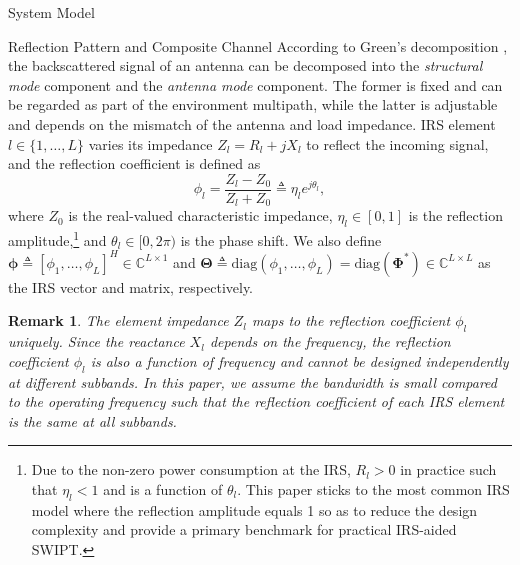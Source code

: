 \documentclass[journal,12pt,onecolumn,draftclsnofoot]{IEEEtran}
\newtheorem{remark}{Remark}
\begin{document}
\begin{section}{System Model}
		\begin{subsection}{Reflection Pattern and Composite Channel}
			According to Green's decomposition \cite{Hansen1989}, the backscattered signal of an antenna can be decomposed into the \emph{structural mode} component and the \emph{antenna mode} component. The former is fixed and can be regarded as part of the environment multipath, while the latter is adjustable and depends on the mismatch of the antenna and load impedance. IRS element $l \in \{1, \dots, L\}$ varies its impedance $Z_l = R_l + j X_l$ to reflect the incoming signal, and the reflection coefficient is defined as
			\begin{equation}
				\phi_l = \frac{Z_l - Z_0}{Z_l + Z_0} \triangleq \eta_l e^{j\theta_l},
			\end{equation}
			where $Z_0$ is the real-valued characteristic impedance, $\eta_l \in [0, 1]$ is the reflection amplitude,\footnote{Due to the non-zero power consumption at the IRS, $R_l > 0$ in practice such that $\eta_l < 1$ and is a function of $\theta_l$. This paper sticks to the most common IRS model where the reflection amplitude equals \num{1} so as to reduce the design complexity and provide a primary benchmark for practical IRS-aided SWIPT.} and $\theta_l \in [0,2\pi)$ is the phase shift. We also define $\boldsymbol{\phi} \triangleq [\phi_1, \dots, \phi_L]^H \in \mathbb{C}^{L \times 1}$ and $\boldsymbol{\Theta} \triangleq \mathrm{diag}(\phi_1, \dots, \phi_L)=\mathrm{diag}(\boldsymbol{\Phi}^*) \in \mathbb{C}^{L \times L}$ as the IRS vector and matrix, respectively.

			\begin{remark}\label{re:reflection_coefficient}
				The element impedance $Z_l$ maps to the reflection coefficient $\phi_l$ uniquely. Since the reactance $X_l$ depends on the frequency, the reflection coefficient $\phi_l$ is also a function of frequency and cannot be designed independently at different subbands. In this paper, we assume the bandwidth is small compared to the operating frequency such that the reflection coefficient of each IRS element is the same at all subbands.
			\end{remark}


\end{subsection}
\end{section}
\end{document}
